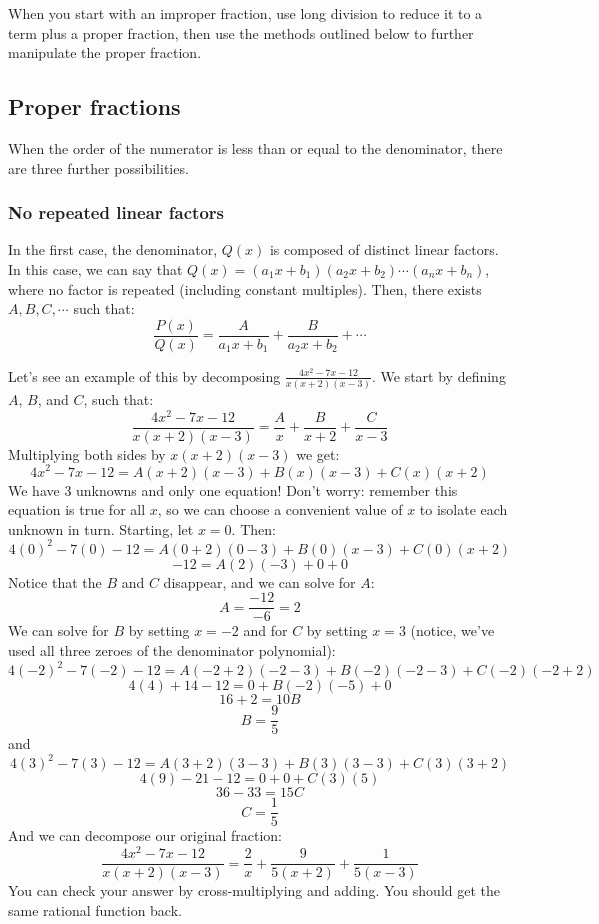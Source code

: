 When you start with an improper fraction, use long division to reduce it to a 
term plus a proper fraction, then use the methods outlined below to further 
manipulate the proper fraction. 

\subsection{Proper fractions}
When the order of the numerator is less than or equal to the denominator, 
there are three further possibilities. 

\subsubsection{No repeated linear factors}
In the first case, the denominator, $Q(x)$ is composed of distinct linear 
factors. In this case, we can say that $Q(x) = (a_1x + b_1)(a_2x + b_2) \cdots 
(a_nx + b_n)$, where no factor is repeated (including constant multiples). 
Then, there exists $A, B, C, \cdots$ such that:
$$\frac{P(x)}{Q(x)} = \frac{A}{a_1x+b_1} + \frac{B}{a_2x + b_2} + \cdots$$

Let's see an example of this by decomposing $\frac{4x^2 - 7x - 12}{x (x + 2) (x 
- 3)}$. We start by defining $A$, $B$, and $C$, such that:
$$\frac{4x^2 - 7x - 12}{x (x + 2) (x - 3)} = \frac{A}{x} + \frac{B}{x + 2} + 
\frac{C}{x - 3}$$
Multiplying both sides by $x (x + 2) (x - 3)$ we get:
$$4x^2 - 7x - 12 = A(x + 2)(x - 3) + B(x)(x - 3) + C(x)(x + 2)$$
We have 3 unknowns and only one equation! Don't worry: remember this equation 
is true for all $x$, so we can choose a convenient value of $x$ to isolate 
each unknown in turn. Starting, let $x = 0$. Then:
$$4(0)^2 - 7(0) - 12 = A(0 + 2)(0 - 3) + B(0)(x - 3) + C(0)(x + 2)$$
$$-12 = A(2)(-3) + 0 + 0$$
Notice that the $B$ and $C$ disappear, and we can solve for $A$:
$$A = \frac{-12}{-6} = 2$$
We can solve for $B$ by setting $x = -2$ and for $C$ by setting $x = 3$ 
(notice, we've used all three zeroes of the denominator polynomial):
$$4(-2)^2 - 7(-2) - 12 = A(-2 + 2)(-2 - 3) + B(-2)(-2 - 3) + C(-2)(-2 + 2)$$
$$4(4) + 14 - 12 = 0 + B(-2)(-5) + 0$$
$$16 + 2 = 10B$$
$$B = \frac{9}{5}$$
and
$$4(3)^2 - 7(3) - 12 = A(3 + 2)(3 - 3) + B(3)(3 - 3) + C(3)(3 + 2)$$
$$4(9) - 21 - 12 = 0 + 0 + C(3)(5)$$
$$36 - 33 = 15C$$
$$C = \frac{1}{5}$$
And we can decompose our original fraction:
$$\frac{4x^2 - 7x - 12}{x (x + 2) (x - 3)} = \frac{2}{x} + \frac{9}{5(x + 2)} 
+ \frac{1}{5(x - 3)}$$
You can check your answer by cross-multiplying and adding. You should get the 
same rational function back. 

